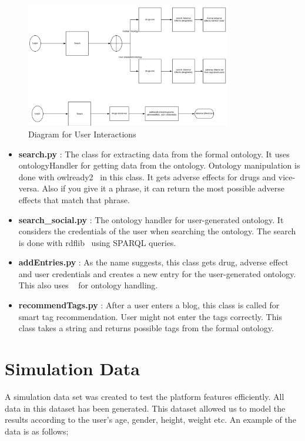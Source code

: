 \documentclass[21pt,a4paper,notitlepage]{report}
\begin{document}
\begin{figure}
	\centering
	\includegraphics[width=0.8\textwidth]{use.png}
	\caption{Diagram for User Interactions}
	\label{fig:use}
\end{figure}

\begin{itemize}
	\item \textbf{search.py} : The class for extracting data from the formal ontology. It uses ontologyHandler for getting data from the ontology.
	Ontology manipulation is done with owlready2~\cite{owlready} in this class.
	It gets adverse effects for drugs and vice-versa. Also if you give it a phrase,
	it can return the most possible adverse effects that match that phrase.
	\item \textbf{search\_social.py} : The ontology handler for user-generated ontology. It considers the credentials of the user when searching the ontology.
	The search is done with rdflib~\cite{rdflib} using SPARQL queries.
	\item \textbf{addEntries.py} : As the name suggests, this class gets drug,
	adverse effect and user credentials and creates a new entry for the user-generated ontology. This also uses ~\cite{owlready} for ontology handling.
	\item \textbf{recommendTags.py} : After a user enters a blog, this class
	is called for smart tag recommendation. User might not enter the tags correctly. This class takes a string and returns possible tags from the formal ontology.
\end{itemize}



\section{Simulation Data}
A simulation data set was created to test the platform features efficiently. All data in this dataset has been generated. This dataset allowed us to model the results according to the user’s age, gender, height, weight etc. An example of the data is as follows;
\end{document}
